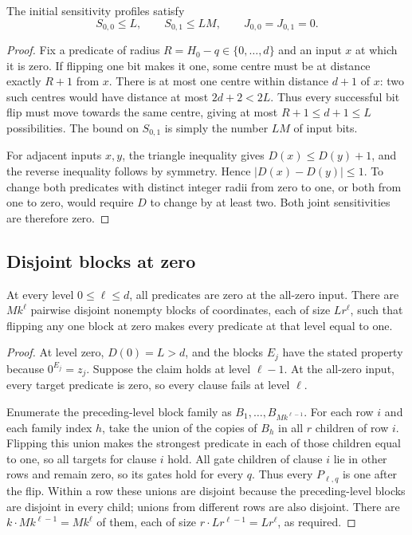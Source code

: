 \begin{lemma}\label{lem:base}
The initial sensitivity profiles satisfy
\begin{equation}\label{eq:base-profile}
 S_{0,0}\le L,\qquad S_{0,1}\le LM,\qquad
 J_{0,0}=J_{0,1}=0.
\end{equation}
\end{lemma}
\begin{proof}
Fix a predicate of radius \(R=H_0-q\in\{0,\ldots,d\}\) and an
input \(x\) at which it is zero. If flipping one bit makes it one,
some centre must be at distance exactly \(R+1\) from \(x\).
There is at most one centre within distance \(d+1\) of \(x\):
two such centres would have distance at most \(2d+2<2L\).
Thus every successful bit flip must move towards the same centre,
giving at most \(R+1\le d+1\le L\) possibilities.
The bound on \(S_{0,1}\) is simply the number \(LM\) of input bits.

For adjacent inputs \(x,y\), the triangle inequality gives
\(D(x)\le D(y)+1\), and the reverse inequality follows by symmetry.
Hence \(|D(x)-D(y)|\le1\). To change both predicates with distinct
integer radii from zero to one, or both from one to zero, would require
\(D\) to change by at least two. Both joint sensitivities are therefore
zero.
\end{proof}

\subsection{Disjoint blocks at zero}
\begin{lemma}\label{lem:blocks}
At every level \(0\le\ell\le d\), all predicates are zero at the
all-zero input. There are \(Mk^\ell\) pairwise disjoint nonempty blocks
of coordinates, each of size \(Lr^\ell\), such that flipping any one
block at zero makes every predicate at that level equal to one.
\end{lemma}
\begin{proof}
At level zero, \(D(0)=L>d\), and the blocks \(E_j\) have the stated
property because \(0^{E_j}=z_j\).
Suppose the claim holds at level \(\ell-1\). At the all-zero input,
every target predicate is zero, so every clause fails at level \(\ell\).

Enumerate the preceding-level block family as
\(B_1,\ldots,B_{Mk^{\ell-1}}\).
For each row \(i\) and each family index \(h\), take the union of the
copies of \(B_h\) in all \(r\) children of row \(i\).
Flipping this union makes the strongest predicate in each of those
children equal to one, so all targets for clause \(i\) hold.
All gate children of clause \(i\) lie in other rows and remain zero,
so its gates hold for every \(q\).
Thus every \(P_{\ell,q}\) is one after the flip.
Within a row these unions are disjoint because the preceding-level
blocks are disjoint in every child; unions from different rows are
also disjoint. There are \(k\cdot Mk^{\ell-1}=Mk^\ell\) of them,
each of size \(r\cdot Lr^{\ell-1}=Lr^\ell\), as required.
\end{proof}
